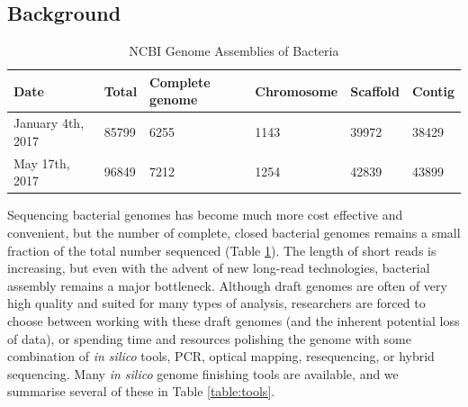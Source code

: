 \documentclass[11pt]{article}
\begin{document}
\begin{linenumbers}


\section*{Background}

\begin{table}[H]
\centering
\caption{NCBI Genome Assemblies of Bacteria}
\label{table:completions}
\begin{tabular}{llllll}
  Date & Total & Complete genome & Chromosome & Scaffold & Contig \\
  \hline
  January 4th, 2017 & 85799 & 6255 & 1143 & 39972 & 38429  \\
  May 17th, 2017 & 96849 & 7212 & 1254 & 42839 & 43899
\end{tabular}
\end{table}

Sequencing bacterial genomes has become much more cost effective and convenient, but the number of complete, closed bacterial genomes remains a small fraction of the total number sequenced (Table \ref{table:completions}). The length of short reads is increasing, but even with the advent of new long-read technologies, bacterial assembly remains a major bottleneck\cite{Nagarajan2010,Brouwer2016}. Although draft genomes are often of very high quality and suited for many types of analysis, researchers are forced to choose between working with these draft genomes (and the inherent potential loss of data), or spending time and resources polishing the genome with some combination of \textit{in silico} tools, PCR, optical mapping, resequencing, or hybrid sequencing\cite{Nagarajan2010,Utturkar2014}. Many \textit{in silico} genome finishing tools are available, and we summarise several of these in Table \ref{table:tools}.





\end{linenumbers}
\end{document}
